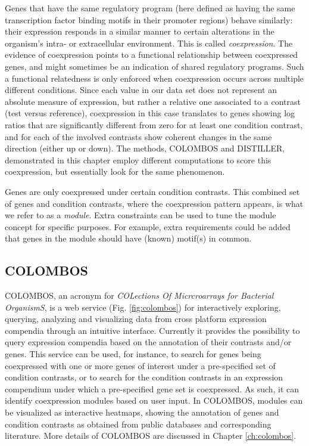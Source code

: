 Genes that have the same regulatory program (here defined as having the same 
transcription factor binding motifs in their promoter regions) behave 
similarly: their expression responds in a similar manner to certain alterations 
in the organism's intra- or extracellular environment. This is called 
\textit{coexpression}. The evidence of coexpression points to a functional 
relationship between coexpressed genes, and might sometimes be an indication of 
shared regulatory programs. 
%
Such a functional relatedness is only enforced when coexpression occurs across
multiple different conditions. Since each value in our data set does not
represent an absolute measure of expression, but rather a relative one
associated to a contrast (test versus reference), coexpression in this case
translates to genes showing log ratios that are significantly different from
zero for at least one condition contrast, and for each of the involved contrasts
show coherent changes in the same direction (either up or down).
%
The methods, COLOMBOS and DISTILLER, demonstrated in this chapter employ
different computations to score this coexpression, but essentially look for the
same phenomenon.

Genes are only coexpressed under certain condition contrasts. This combined set
of genes and condition contrasts, where the coexpression pattern appears, is
what we refer to as a \textit{module}. Extra constraints can be used to tune the
module concept for specific purposes. For example, extra requirements could be
added that genes in the module should have (known) motif(s) in common.


\subsection{COLOMBOS}

COLOMBOS, an acronym for \textit{COLections Of Micrcroarrays for Bacterial
  OrganismS}, is a web service \cite{COLOMBOS, Meysman2014}
(Fig. \ref{fig:colombos}) for interactively exploring, querying, analyzing and
visualizing data from cross platform expression compendia through an intuitive
interface.
%
Currently it provides the possibility to query expression compendia based on the
annotation of their contrasts and/or genes.
%
This service can be used, for instance, to search for genes being coexpressed
with one or more genes of interest under a pre-specified set of condition
contrasts, or to search for the condition contrasts in an expression compendium
under which a pre-specified gene set is coexpressed. As such, it can identify
coexpression modules based on user input.
%
In COLOMBOS, modules can be visualized as interactive heatmaps, showing the
annotation of genes and condition contrasts as obtained from public databases
and corresponding literature. More details of COLOMBOS are discussed in Chapter
\ref{ch:colombos}.

